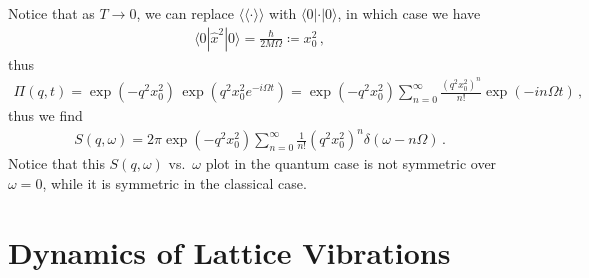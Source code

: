 \documentclass[11pt, oneside]{book}
\theoremstyle{break}
\theoremstyle{break}
\begin{document}
Notice that as $T\to 0$, we can replace $\langle\langle \cdot \rangle\rangle$ with $\langle 0 | \cdot |0\rangle$, in which case we have 
\begin{align*}
\langle 0 | \hat{x}^2|0\rangle = \frac{\hbar}{2M\Omega} \coloneqq x_0^2\,,
\end{align*}
thus 
\begin{align*}
\Pi(q,t) = \exp({-q^2 x_0^2})\,\exp({q^2x_0^2e^{-i\Omega t}}) = \exp(-q^2x_0^2) \sum_{n=0}^\infty 
\frac{(q^2x_0^2)^n}{n!}\exp\left( -in\Omega t\right)\,,
\end{align*}
thus we find 
\begin{align*}
S(q,\omega)  = 2\pi\exp(-q^2 x_0^2)\sum_{n=0}^\infty \frac{1}{n!}(q^2x_0^2)^n \delta(\omega - n\Omega)\,.
\end{align*}
Notice that this $S(q,\omega)$ vs.\ $\omega$ plot in the quantum case is not symmetric over $\omega = 0$, while it is symmetric in the classical case. \\

\section{Dynamics of Lattice Vibrations}
\end{document}
